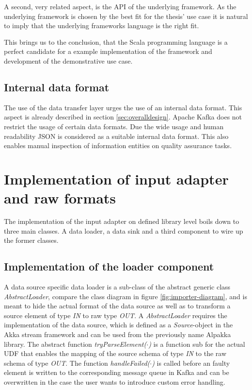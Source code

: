 A second, very related aspect, is the API of the underlying framework. As the underlying framework is chosen by the best fit for the thesis' use case it is natural to imply that the underlying frameworks language is the right fit. 

This brings us to the conclusion, that the Scala programming language is a perfect candidate for a example implementation of the framework and development of the demonstrative use case.

\subsection{Internal data format}
The use of the data transfer layer urges the use of an internal data format. This aspect is already described in section \ref{sec:overalldesign}. Apache Kafka does not restrict the usage of certain data formats. Due the wide usage and human readability JSON is considered as a suitable internal data format. This also enables manual inspection of information entities on quality assurance tasks. 

\section{Implementation of input adapter and raw formats}

The implementation of the input adapter on defined library level boils down to three main classes. A data loader, a data sink and a third component to wire up the former classes. 

\subsection{Implementation of the loader component \label{ssec:loadercomponent}}

A data source specific data loader is a sub-class of the abstract generic class \textit{AbstractLoader}, compare the class diagram in figure \ref{fig:importer-diagram}, and is meant to hide the actual format of the data source as well as to transform a source element of type \textit{IN} to raw type \textit{OUT}. A \textit{AbstractLoader} requires the implementation of the data source, which is defined as a \textit{Source}-object in the Akka stream framework and can be used from the previously name Alpakka library. The abstract function \textit{tryParseElement($\cdot$)} is a function sub for the actual UDF that enables the mapping of the source schema of type \textit{IN} to the raw schema of type \textit{OUT}. The function \textit{handleFailed($\cdot$)} is called before an faulty element is written to the corresponding message queue in Kafka and can be overwritten in the case the user wants to introduce custom error handling.

